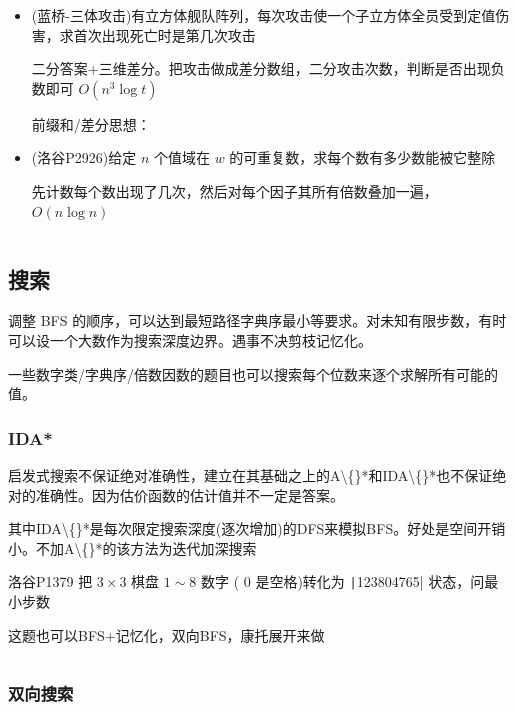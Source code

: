\documentclass[twocolumn,10pt]{ctexart}
\begin{document}
\begin{itemize}
\item (蓝桥-三体攻击)有立方体舰队阵列，每次攻击使一个子立方体全员受到定值伤害，求首次出现死亡时是第几次攻击

二分答案+三维差分。把攻击做成差分数组，二分攻击次数，判断是否出现负数即可 $O(n^3\log t)$

前缀和/差分思想：
\end{itemize}

\begin{itemize}
\item (洛谷P2926)给定 $n$ 个值域在 $w$ 的可重复数，求每个数有多少数能被它整除

先计数每个数出现了几次，然后对每个因子其所有倍数叠加一遍， $O(n\log n)$

\inputminted{cpp}{code/p2926_prefixsum.cpp}
\end{itemize}

\subsection{搜索}

调整 BFS 的顺序，可以达到最短路径字典序最小等要求。对未知有限步数，有时可以设一个大数作为搜索深度边界。遇事不决剪枝记忆化。

一些数字类/字典序/倍数因数的题目也可以搜索每个位数来逐个求解所有可能的值。

\subsubsection{IDA*}

启发式搜索不保证绝对准确性，建立在其基础之上的A\textbackslash\{\}*和IDA\textbackslash\{\}*也不保证绝对的准确性。因为估价函数的估计值并不一定是答案。

其中IDA\textbackslash\{\}*是每次限定搜索深度(逐次增加)的DFS来模拟BFS。好处是空间开销小。不加A\textbackslash\{\}*的该方法为迭代加深搜索

\begin{notebox}
洛谷P1379 把 $3\times 3$ 棋盘 $1\sim 8$ 数字 ( $0$ 是空格)转化为 \texttt|123804765| 状态，问最小步数
\end{notebox}

这题也可以BFS+记忆化，双向BFS，康托展开来做

\inputminted{cpp}{code/p1379_ida_star.cpp}

\subsubsection{双向搜索}
\end{document}
